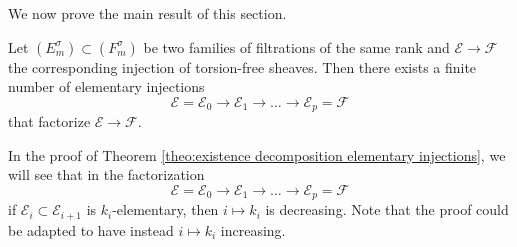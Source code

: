 \documentclass[a4paper,10pt]{amsart}
\theoremstyle{plain}{
    \newtheorem{theorem}{Theorem}[section]
    \newtheorem{lemma}[theorem]{Lemma}
    \newtheorem{corollary}[theorem]{Corollary}
    \newtheorem{proposition}[theorem]{Proposition}
    \newtheorem{conjecture}[theorem]{Conjecture}
}
\theoremstyle{definition}{
    \newtheorem{definition}[theorem]{Definition}
    \newtheorem{defn-thm}[theorem]{Definition-Theorem}
    \newtheorem{example}[theorem]{Example}
    \newtheorem{notation}[theorem]{Notation}
}
\theoremstyle{remark}{
    \newtheorem{remark}[theorem]{Remark}
    \newtheorem{problem}[theorem]{Problem}
    \newtheorem{question}[theorem]{Question}
}
\def\cF{\mathcal{F}}
\def\cE{\mathcal{E}}
\begin{document}
We now prove the main result of this section.
\begin{theorem}
 \label{theo:existence decomposition elementary injections}
 Let $(E^\sigma_m)\subset (F^\sigma_m)$ be two families of filtrations of the same rank and $\cE\to\cF$ the corresponding injection of torsion-free sheaves. Then there exists a finite number of elementary injections
 $$
 \cE=\cE_0\to\cE_1\to\ldots\to\cE_p=\cF
 $$
 that factorize $\cE\to\cF$.
\end{theorem}
\begin{remark}
 \label{rem:decomposition I well ordered}
 In the proof of Theorem \ref{theo:existence decomposition elementary injections}, we will see that in the factorization
  $$
 \cE=\cE_0\to\cE_1\to\ldots\to\cE_p=\cF
 $$
 if $\cE_i\subset\cE_{i+1}$ is $k_i$-elementary, then $i\mapsto k_i$ is decreasing. Note that the proof could be adapted to have instead $i\mapsto k_i$ increasing.
\end{remark}
\end{document}
